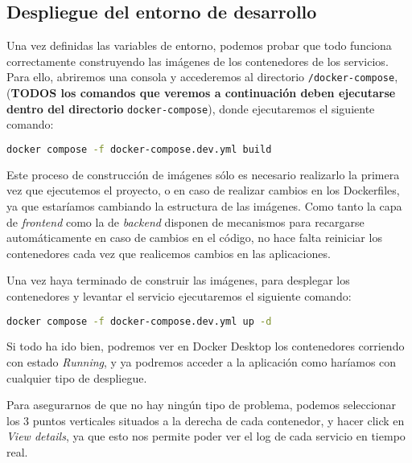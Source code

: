 \subsection{Despliegue del entorno de desarrollo}


Una vez definidas las variables de entorno, podemos probar que todo funciona correctamente construyendo las imágenes de los contenedores de los servicios. Para ello, abriremos una consola y accederemos al directorio \verb,/docker-compose,, (\textbf{TODOS los comandos que veremos a continuación deben ejecutarse dentro del directorio} \verb,docker-compose,), donde ejecutaremos el siguiente comando:

\begin{lstlisting}[language=Bash]
docker compose -f docker-compose.dev.yml build
\end{lstlisting}


Este proceso de construcción de imágenes sólo es necesario realizarlo la primera vez que ejecutemos el proyecto, o en caso de realizar cambios en los Dockerfiles, ya que estaríamos cambiando la estructura de las imágenes. Como tanto la capa de \textit{frontend} como la de \textit{backend} disponen de mecanismos para recargarse automáticamente en caso de cambios en el código, no hace falta reiniciar los contenedores cada vez que realicemos cambios en las aplicaciones.

Una vez haya terminado de construir las imágenes, para desplegar los contenedores y levantar el servicio ejecutaremos el siguiente comando:

\begin{lstlisting}[language=Bash]
docker compose -f docker-compose.dev.yml up -d
\end{lstlisting}


Si todo ha ido bien, podremos ver en Docker Desktop los contenedores corriendo con estado \textit{Running}, y ya podremos acceder a la aplicación como haríamos con cualquier tipo de despliegue. 


Para asegurarnos de que no hay ningún tipo de problema, podemos seleccionar los 3 puntos verticales situados a la derecha de cada contenedor, y hacer click en \textit{View details}, ya que esto nos permite poder ver el log de cada servicio en tiempo real. 

